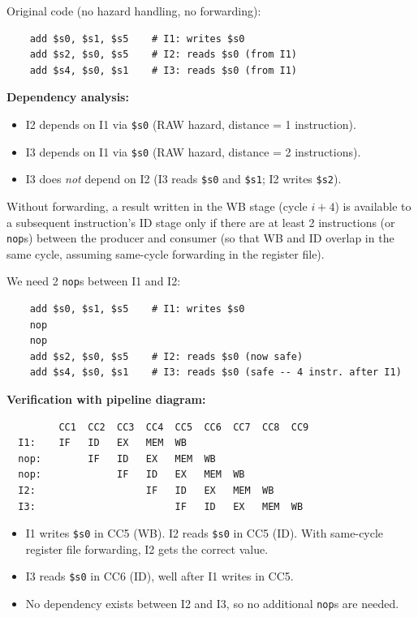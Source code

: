 Original code (no hazard handling, no forwarding):

\begin{verbatim}
    add $s0, $s1, $s5    # I1: writes $s0
    add $s2, $s0, $s5    # I2: reads $s0 (from I1)
    add $s4, $s0, $s1    # I3: reads $s0 (from I1)
\end{verbatim}

\noindent\textbf{Dependency analysis:}
\begin{itemize}
  \item I2 depends on I1 via \texttt{\$s0} (RAW hazard, distance = 1 instruction).
  \item I3 depends on I1 via \texttt{\$s0} (RAW hazard, distance = 2 instructions).
  \item I3 does \emph{not} depend on I2 (I3 reads \texttt{\$s0} and
        \texttt{\$s1}; I2 writes \texttt{\$s2}).
\end{itemize}

Without forwarding, a result written in the WB stage (cycle $i + 4$) is
available to a subsequent instruction's ID stage only if there are at least 2
instructions (or \texttt{nop}s) between the producer and consumer (so that WB
and ID overlap in the same cycle, assuming same-cycle forwarding in the
register file).

We need 2 \texttt{nop}s between I1 and I2:

\begin{verbatim}
    add $s0, $s1, $s5    # I1: writes $s0
    nop
    nop
    add $s2, $s0, $s5    # I2: reads $s0 (now safe)
    add $s4, $s0, $s1    # I3: reads $s0 (safe -- 4 instr. after I1)
\end{verbatim}

\noindent\textbf{Verification with pipeline diagram:}

\begin{verbatim}
         CC1  CC2  CC3  CC4  CC5  CC6  CC7  CC8  CC9
  I1:    IF   ID   EX   MEM  WB
  nop:        IF   ID   EX   MEM  WB
  nop:             IF   ID   EX   MEM  WB
  I2:                   IF   ID   EX   MEM  WB
  I3:                        IF   ID   EX   MEM  WB
\end{verbatim}

\begin{itemize}
  \item I1 writes \texttt{\$s0} in CC5 (WB). I2 reads \texttt{\$s0} in CC5
        (ID). With same-cycle register file forwarding, I2 gets the correct
        value. \checkmark
  \item I3 reads \texttt{\$s0} in CC6 (ID), well after I1 writes in CC5.
        \checkmark
  \item No dependency exists between I2 and I3, so no additional
        \texttt{nop}s are needed.
\end{itemize}

